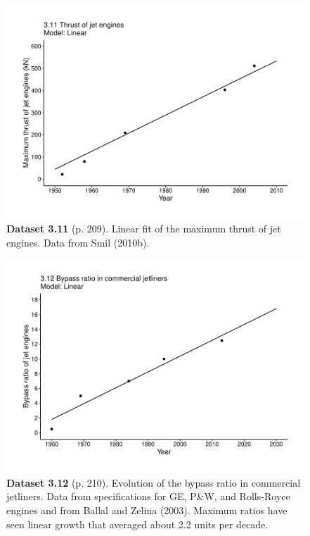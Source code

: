 \documentclass[aps,rmp,preprint,superscriptaddress,10pt,onecolumn]{article}
\begin{document}
\clearpage
\begin{figure}[h]
\includegraphics[width=\textwidth]{output/figs-ggplot/3.11.pdf}
\caption*{\textbf{Dataset 3.11} (p. 209). Linear fit of the maximum thrust of jet engines. Data from Smil (2010b).}
\end{figure}
	
\clearpage
\begin{figure}[h]
\includegraphics[width=\textwidth]{output/figs-ggplot/3.12.pdf}
\caption*{\textbf{Dataset 3.12} (p. 210). Evolution of the bypass ratio in commercial jetliners. Data from specifications for GE, P\&W, and Rolls-Royce engines and from Ballal and Zelina (2003). Maximum ratios have seen linear growth that averaged about 2.2 units per decade.}
\end{figure}
	
\end{document}
